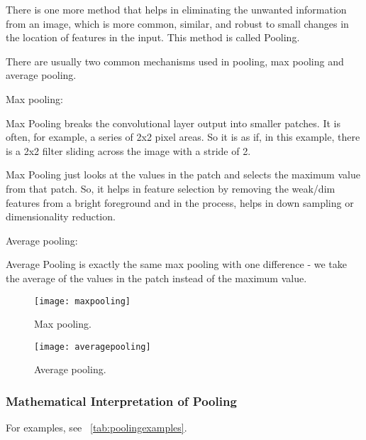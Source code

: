 	\begin{bulletedlist}
		\item There is one more method that helps in eliminating the unwanted information from an image, which is more common, similar, and robust to small changes in the location of features in the input. This method is called Pooling.
		\item There are usually two common mechanisms used in pooling, max pooling and average pooling.
		\item Max pooling:
		\begin{bulletedlist}
			\item Max Pooling breaks the convolutional layer output into smaller patches. It is often, for example, a series of 2x2 pixel areas. So it is as if, in this example, there is a 2x2 filter sliding across the image with a stride of 2.
			\item Max Pooling just looks at the values in the patch and selects the maximum value from that patch. So, it helps in feature selection by removing the weak/dim features from a bright foreground and in the process, helps in down sampling or dimensionality reduction.
		\end{bulletedlist}
		\item Average pooling:
		\begin{bulletedlist}
			\item Average Pooling is exactly the same max pooling with one difference - we take the average of the values in the patch instead of the maximum value.
		\end{bulletedlist}
	\end{bulletedlist}

	\begin{figure}[htb]
		\centering
		\texttt{[image: maxpooling]}
		\caption[Max pooling]{Max pooling.}
		\label{fig:maxpooling}
	\end{figure}

	\begin{figure}[htb]
		\centering
		\texttt{[image: averagepooling]}
		\caption[Average pooling]{Average pooling.}
		\label{fig:averagepooling}
	\end{figure}

	\subsubsection{Mathematical Interpretation of Pooling}
For examples, see \tablename~\ref{tab:poolingexamples}.

